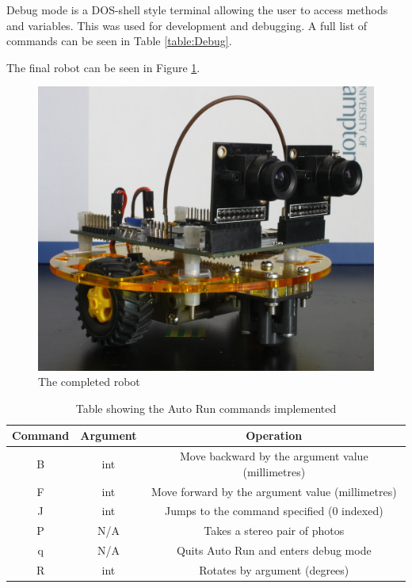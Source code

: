 Debug mode is a DOS-shell style terminal allowing the user to access methods and variables. This was used for development and debugging. A full list of commands can be seen in Table \ref{table:Debug}. 

The final robot can be seen in Figure \ref{fig:Robot:Complete}.

\begin{figure}
\includegraphics[width=\textwidth]{Figures/Robot.jpg}
\caption{The completed robot}
\label{fig:Robot:Complete}
\end{figure}

\begin{table}
\centering
\caption{Table showing the Auto Run commands implemented}
\label{table:AutoRun}
\begin{tabular}{ccc}\toprule
\textbf{Command} & 	\textbf{Argument} 			& 	\textbf{Operation} \\\toprule
B		&	int					&	Move backward by the argument value (millimetres) \\\midrule
F		&	int 				&	Move forward by the argument value (millimetres)\\\midrule
J		&	int					&	Jumps to the command specified (0 indexed)\\\midrule
P		&	N/A					&	Takes a stereo pair of photos\\\midrule
q		&	N/A					&	Quits Auto Run and enters debug mode\\\midrule
R		& 	int 			 	&	Rotates by argument (degrees)\\ \bottomrule
\end{tabular}
\end{table}

